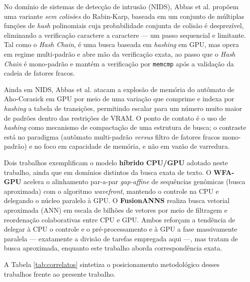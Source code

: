 \documentclass[12pt]{article}
\begin{document}
No domínio de sistemas de detecção de intrusão (NIDS), Abbas et al. \cite{abbas2024-rabinkarp} propõem uma variante \textit{sem colisões} do Rabin-Karp, baseada em um conjunto de múltiplas funções de \textit{hash} polinomiais cuja probabilidade conjunta de colisão é desprezível, eliminando a verificação caractere a caractere — um passo sequencial e limitante. Tal como o \textit{Hash Chain}, é uma busca baseada em \textit{hashing} em GPU, mas opera em regime multi-padrão e abre mão da verificação exata, ao passo que o \textit{Hash Chain} é mono-padrão e mantém a verificação por \texttt{memcmp} após a validação da cadeia de fatores fracos.

Ainda em NIDS, Abbas et al. \cite{abbas2024-ahocorasick} atacam a explosão de memória do autômato de Aho-Corasick em GPU por meio de uma variação que comprime e indexa por \textit{hashing} a tabela de transições, permitindo escalar para um número muito maior de padrões dentro das restrições de VRAM. O ponto de contato é o uso de \textit{hashing} como mecanismo de compactação de uma estrutura de busca; o contraste está no paradigma (autômato multi-padrão \textit{versus} filtro de fatores fracos mono-padrão) e no foco em capacidade de memória, e não em vazão de varredura.

Dois trabalhos exemplificam o modelo \textbf{híbrido CPU/GPU} adotado neste trabalho, ainda que em domínios distintos da busca exata de texto. O \textbf{WFA-GPU} \cite{aguado-puig2023} acelera o alinhamento par-a-par \textit{gap-affine} de sequências genômicas (busca aproximada) com o algoritmo \textit{wavefront}, mantendo o controle na CPU e delegando o núcleo paralelo à GPU. O \textbf{FusionANNS} \cite{tian2025} realiza busca vetorial aproximada (ANN) em escala de bilhões de vetores por meio de filtragem e reordenação colaborativas entre CPU e GPU. Ambos reforçam a tendência de delegar à CPU o controle e o pré-processamento e à GPU a fase massivamente paralela — exatamente a divisão de tarefas empregada aqui —, mas tratam de busca aproximada, enquanto este trabalho aborda correspondência exata.

A Tabela \ref{tab:correlatos} sintetiza o posicionamento metodológico desses trabalhos frente ao presente trabalho.
\end{document}
